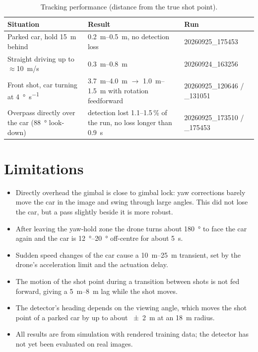 \documentclass[11pt,a4paper]{report}
\begin{document}
\begin{table}[htbp]
  \centering
  \caption{Tracking performance (distance from the true shot point).}
  \label{tab:results}
  \begin{tabular}{@{}p{62mm}ll@{}}
    \toprule
    Situation & Result & Run \\
    \midrule
    Parked car, hold \SI{15}{m} behind & \SIrange{0.2}{0.5}{m}, no detection loss & 20260925\_175453 \\
    Straight driving up to $\approx$\SI{10}{m/s} & \SIrange{0.3}{0.8}{m} & 20260924\_163256 \\
    Front shot, car turning at \SI{4}{\degree\per\second} & \SIrange{3.7}{4.0}{m} $\to$ \SIrange{1.0}{1.5}{m} with rotation feedforward & 20260925\_120646 / \_131051 \\
    Overpass directly over the car (\SI{88}{\degree} look-down) & detection lost 1.1--1.5\,\% of the run, no loss longer than \SI{0.9}{s} & 20260925\_173510 / \_175453 \\
    \bottomrule
  \end{tabular}
\end{table}

\section{Limitations}
\label{sec:limitations}

\begin{itemize}
  \item Directly overhead the gimbal is close to gimbal lock: yaw corrections
        barely move the car in the image and swing through large angles. This
        did not lose the car, but a pass slightly beside it is more robust.
  \item After leaving the yaw-hold zone the drone turns about \SI{180}{\degree} to
        face the car again and the car is \SIrange{12}{20}{\degree} off-centre for
        about \SI{5}{s}.
  \item Sudden speed changes of the car cause a \SIrange{10}{25}{m} transient, set
        by the drone's acceleration limit and the actuation delay.
  \item The motion of the shot point during a transition between shots is not fed
        forward, giving a \SIrange{5}{8}{m} lag while the shot moves.
  \item The detector's heading depends on the viewing angle, which moves the shot
        point of a parked car by up to about \SI{\pm 2}{m} at an \SI{18}{m} radius.
  \item All results are from simulation with rendered training data; the detector
        has not yet been evaluated on real images.
\end{itemize}
\end{document}

